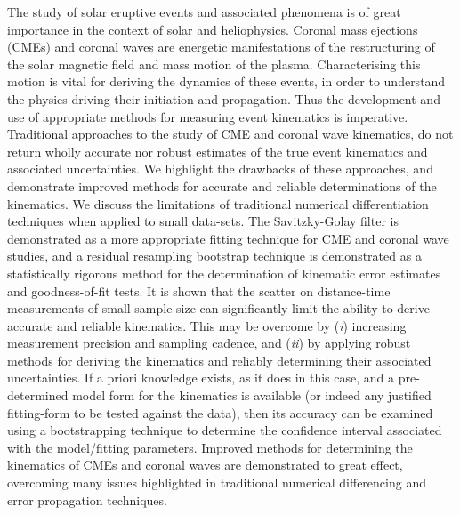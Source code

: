 \documentclass[structabstract]{aa}
\begin{document}
\date{Received ?; accepted ?}
\abstract
{The study of solar eruptive events and associated phenomena is of great importance in the context of solar and heliophysics. Coronal mass ejections (CMEs) and coronal waves are energetic manifestations of the restructuring of the solar magnetic field and mass motion of the plasma. Characterising this motion is vital for deriving the dynamics of these events, in order to understand the physics driving their initiation and propagation. Thus the development and use of appropriate methods for measuring event kinematics is imperative.} 
{Traditional approaches to the study of CME and coronal wave kinematics, do not return wholly accurate nor robust estimates of the true event kinematics and associated uncertainties. We highlight the drawbacks of these approaches, and demonstrate improved methods for accurate and reliable determinations of the kinematics.}
{We discuss the limitations of traditional numerical differentiation techniques when applied to small data-sets. The Savitzky-Golay filter is demonstrated as a more appropriate fitting technique for CME and coronal wave studies, and a residual resampling bootstrap technique is demonstrated as a statistically rigorous method for the determination of kinematic error estimates and goodness-of-fit tests.}
{It is shown that the scatter on distance-time measurements of small sample size can significantly limit the ability to derive accurate and reliable kinematics. This may be overcome by (\emph{i}) increasing measurement precision and sampling cadence, and (\emph{ii}) by applying robust methods for deriving the kinematics and reliably determining their associated uncertainties. If a priori knowledge exists, as it does in this case, and a pre-determined model form for the kinematics is available (or indeed any justified fitting-form to be tested against the data), then its accuracy can be examined using a bootstrapping technique to determine the confidence interval associated with the model/fitting parameters.}
{Improved methods for determining the kinematics of CMEs and coronal waves are demonstrated to great effect, overcoming many issues highlighted in traditional numerical differencing and error propagation techniques.}


\end{document}

